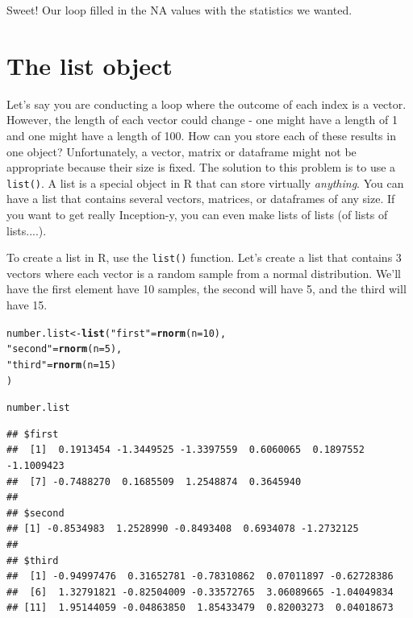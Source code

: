 \documentclass{tufte-book}\usepackage[]{graphicx}\usepackage[]{color}
\makeatletter
\newcommand{\hlnum}[1]{\textcolor[rgb]{0.686,0.059,0.569}{#1}}%
\newcommand{\hlstr}[1]{\textcolor[rgb]{0.192,0.494,0.8}{#1}}%
\newcommand{\hlstd}[1]{\textcolor[rgb]{0.345,0.345,0.345}{#1}}%
\newcommand{\hlkwb}[1]{\textcolor[rgb]{0.69,0.353,0.396}{#1}}%
\newcommand{\hlkwc}[1]{\textcolor[rgb]{0.333,0.667,0.333}{#1}}%
\newcommand{\hlkwd}[1]{\textcolor[rgb]{0.737,0.353,0.396}{\textbf{#1}}}%
\newenvironment{kframe}{%
 \def\at@end@of@kframe{}%
 \ifinner\ifhmode%
  \def\at@end@of@kframe{\end{minipage}}%
  \begin{minipage}{\columnwidth}%
 \fi\fi%
 \def\FrameCommand##1{\hskip\@totalleftmargin \hskip-\fboxsep
 \colorbox{shadecolor}{##1}\hskip-\fboxsep
     \hskip-\linewidth \hskip-\@totalleftmargin \hskip\columnwidth}%
 \MakeFramed {\advance\hsize-\width
   \@totalleftmargin\z@ \linewidth\hsize
   \@setminipage}}%
 {\par\unskip\endMakeFramed%
 \at@end@of@kframe}
\newenvironment{knitrout}{}{} %
\makeatother
\begin{document}
Sweet! Our loop filled in the NA values with the statistics we wanted.

\section{The list object}

Let's say you are conducting a loop where the outcome of each index is a vector. However, the length of each vector could change - one might have a length of 1 and one might have a length of 100. How can you store each of these results in one object? Unfortunately, a vector, matrix or dataframe might not be appropriate because their size is fixed. The solution to this problem is to use a \texttt{list()}. A list is a special object in R that can store virtually \textit{anything}. You can have a list that contains several vectors, matrices, or dataframes of any size. If you want to get really Inception-y, you can even make lists of lists (of lists of lists....).

To create a list in R, use the \texttt{list()} function. Let's create a list that contains 3 vectors where each vector is a random sample from a normal distribution. We'll have the first element have 10 samples, the second will have 5, and the third will have 15.

\begin{knitrout}
\color{fgcolor}\begin{kframe}
\begin{alltt}
\hlstd{number.list} \hlkwb{<-} \hlkwd{list}\hlstd{(}\hlstr{"first"} \hlstd{=} \hlkwd{rnorm}\hlstd{(}\hlkwc{n} \hlstd{=} \hlnum{10}\hlstd{),}
     \hlstr{"second"} \hlstd{=} \hlkwd{rnorm}\hlstd{(}\hlkwc{n} \hlstd{=} \hlnum{5}\hlstd{),}
     \hlstr{"third"} \hlstd{=} \hlkwd{rnorm}\hlstd{(}\hlkwc{n} \hlstd{=} \hlnum{15}\hlstd{)}
\hlstd{)}

\hlstd{number.list}
\end{alltt}
\begin{verbatim}
## $first
##  [1]  0.1913454 -1.3449525 -1.3397559  0.6060065  0.1897552 -1.1009423
##  [7] -0.7488270  0.1685509  1.2548874  0.3645940
## 
## $second
## [1] -0.8534983  1.2528990 -0.8493408  0.6934078 -1.2732125
## 
## $third
##  [1] -0.94997476  0.31652781 -0.78310862  0.07011897 -0.62728386
##  [6]  1.32791821 -0.82504009 -0.33572765  3.06089665 -1.04049834
## [11]  1.95144059 -0.04863850  1.85433479  0.82003273  0.04018673
\end{verbatim}
\end{kframe}
\end{knitrout}
\end{document}
